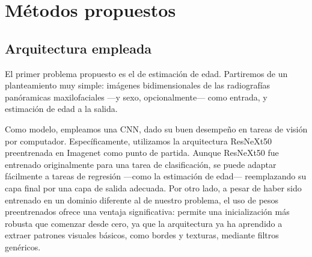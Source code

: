 


\section{Métodos propuestos}

\subsection{Arquitectura empleada}

El primer problema propuesto es el de estimación de edad. Partiremos de un planteamiento muy simple: imágenes bidimensionales de las radiografías panóramicas maxilofaciales ---y sexo, opcionalmente--- como entrada, y estimación de edad a la salida.

Como modelo, empleamos una CNN, dado su buen desempeño en tareas de visión por computador. Específicamente, utilizamos la arquitectura ResNeXt50 \cite{xie2017} preentrenada en Imagenet \cite{deng2009} como punto de partida. Aunque ResNeXt50 fue entrenado originalmente para una tarea de clasificación, se puede adaptar fácilmente a tareas de regresión ---como la estimación de edad--- reemplazando su capa final por una capa de salida adecuada. Por otro lado, a pesar de haber sido entrenado en un dominio diferente al de nuestro problema, el uso de pesos preentrenados ofrece una ventaja significativa: permite una inicialización más robusta que comenzar desde cero, ya que la arquitectura ya ha aprendido a extraer patrones visuales básicos, como bordes y texturas, mediante filtros genéricos.

